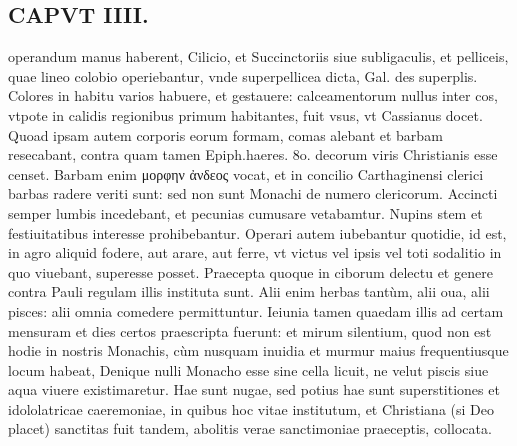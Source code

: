 \documentclass{article}
\begin{document}
\begin{pages}
\section*{CAPVT  IIII. }
\marginpar{[ p.221 ]}\pstart operandum manus haberent, Cilicio, et Succinctoriis siue subligaculis, et pelliceis, quae lineo colobio operiebantur, vnde superpellicea dicta, Gal. des superplis. Colores in habitu varios habuere, et gestauere: calceamentorum nullus inter cos, vtpote in calidis regionibus primum habitantes, fuit vsus, vt Cassianus docet. Quoad ipsam autem corporis eorum formam, comas alebant et barbam resecabant, contra quam tamen Epiph.haeres. 8o. decorum viris Christianis esse censet. Barbam enim μορφην ἀνδεος vocat, et in concilio Carthaginensi clerici barbas radere veriti sunt: sed non sunt Monachi de numero clericorum. Accincti semper lumbis incedebant, et pecunias cumusare vetabamtur. Nupins stem et festiuitatibus interesse prohibebantur. Operari autem iubebantur quotidie, id est, in agro aliquid fodere, aut arare, aut ferre, vt victus vel ipsis vel toti sodalitio in quo viuebant, superesse posset.  \pend\pstart Praecepta quoque in ciborum delectu et genere contra Pauli regulam illis instituta sunt. Alii enim herbas tantùm, alii oua, alii pisces: alii omnia comedere permittuntur. Ieiunia tamen quaedam illis ad certam mensuram et dies certos praescripta fuerunt: et mirum silentium, quod non est hodie in nostris Monachis, cùm nusquam inuidia et murmur maius frequentiusque locum habeat, Denique nulli Monacho esse sine cella licuit, ne velut piscis siue aqua viuere existimaretur. Hae sunt nugae, sed potius hae sunt superstitiones et idololatricae caeremoniae, in quibus hoc vitae institutum, et Christiana (si Deo placet) sanctitas fuit tandem, abolitis verae sanctimoniae praeceptis, collocata.  \pend

\end{pages}
\end{document}
